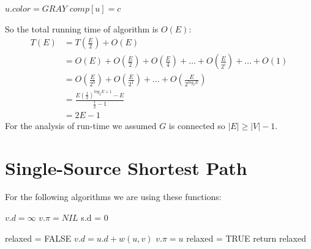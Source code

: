 \documentclass{book}
\begin{document}
	\begin{algorithm*}[h!]
		\begin{algorithmic}[1]
				\State $u.color = GRAY$
				\State $comp[u] = c$
						\State {}
					\EndIf
				\EndFor
			\EndFunction
		\end{algorithmic}
	\end{algorithm*}
	So the total running time of algorithm is $O(E)$:
	\begin{equation*}
		\begin{split}
		T(E) &= T(\frac{E}{2}) + O(E) \\
		&= O(E) + O(\frac{E}{2}) + O(\frac{E}{4}) + \dots + O(\frac{E}{2^i}) + \dots + O(1) \\
		&= O(\frac{E}{2^0}) + O(\frac{E}{2^1}) + \dots + O(\frac{E}{2^{log_2{E}}}) \\
		&= \frac{E(\frac{1}{2})^{log_2{E} + 1} - E}{\frac{1}{2} - 1} \\
		&= 2E - 1
		\end{split}
	\end{equation*}
	For the analysis of run-time we assumed $G$ is connected so $|E| \ge |V| - 1$.
	\chapter{Single-Source Shortest Path}
	
	For the following algorithms we are using these functions:
		\begin{algorithm}[h!]
			\begin{algorithmic}[1]
						\State $v.d = \infty$
						\State $v.\pi = NIL$
					\EndFor
					\State s.d = 0
				\EndFunction
			\end{algorithmic}
			
			\begin{algorithmic}[1]
					\State relaxed = FALSE
						\State $v.d = u.d + w(u, v)$
						\State $v.\pi = u$
						\State relaxed = TRUE
					\EndIf
					\State return relaxed
				\EndFunction
			\end{algorithmic}			
		\end{algorithm}		
	
\end{document}
